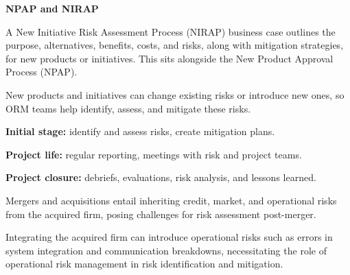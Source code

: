 

\begin{orkeybox}
{\sffamily\bfseries\fontsize{8.6}{10}\selectfont\color{navy}NPAP and NIRAP}\par
\vspace{2pt}
A New Initiative Risk Assessment Process (NIRAP) business case outlines the
purpose, alternatives, benefits, costs, and risks, along with mitigation
strategies, for new products or initiatives. This sits alongside the New Product
Approval Process (NPAP).
\end{orkeybox}

New products and initiatives can change existing risks or introduce new ones, so
ORM teams help identify, assess, and mitigate these risks.

\begin{lettered}
\item \textbf{Initial stage:} identify and assess risks, create mitigation plans.
\item \textbf{Project life:} regular reporting, meetings with risk and project
teams.
\item \textbf{Project closure:} debriefs, evaluations, risk analysis, and lessons
learned.
\end{lettered}


\begin{lettered}
\item Mergers and acquisitions entail inheriting credit, market, and operational
risks from the acquired firm, posing challenges for risk assessment post-merger.
\item Integrating the acquired firm can introduce operational risks such as errors
in system integration and communication breakdowns, necessitating the role of
operational risk management in risk identification and mitigation.
\end{lettered}


